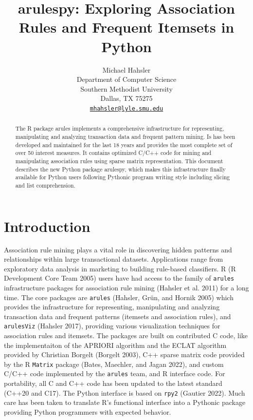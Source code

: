 \documentclass{article}
\title{arulespy: Exploring Association Rules and Frequent Itemsets in
Python}
\author{
    Michael Hahsler
   \\
    Department of Computer Science \\
    Southern Methodist University \\
  Dallas, TX 75275 \\
  \texttt{\href{mailto:mhahsler@lyle.smu.edu}{\nolinkurl{mhahsler@lyle.smu.edu}}} \\
  }
\begin{document}
\maketitle


\begin{abstract}
The R package arules implements a comprehensive infrastructure for
representing, manipulating and analyzing transaction data and frequent
pattern mining. Is has been developed and maintained for the last 18
years and provides the most complete set of over 50 interest measures.
It contains optimized C/C++ code for mining and manipulating association
rules using sparse matrix representation. This document describes the
new Python package arulespy, which makes this infrastructure finally
available for Python users following Pythonic program writing style
including slicing and list comprehension.
\end{abstract}


\hypertarget{introduction}{%
\section{Introduction}\label{introduction}}

Association rule mining plays a vital role in discovering hidden
patterns and relationships within large transactional datasets.
Applications range from exploratory data analysis in marketing to
building rule-based classifiers. R (R Development Core Team 2005) users
have had access to the family of \texttt{arules} infrastructure packages
for association rule mining (Hahsler et al. 2011) for a long time. The
core packages are \texttt{arules} (Hahsler, Grün, and Hornik 2005) which
provides the infrastructure for representing, manipulating and analyzing
transaction data and frequent patterns (itemsets and association rules),
and \texttt{arulesViz} (Hahsler 2017), providing various visualization
techniques for association rules and itemsets. The packages are built on
contributed C code, like the implementaiton of the APRIORI algorithm and
the ECLAT algorithm provided by Christian Borgelt (Borgelt 2003), C++
sparse matrix code provided by the R \texttt{Matrix} package (Bates,
Maechler, and Jagan 2022), and custom C/C++ code implemented by the
\texttt{arules} team, and R interface code. For portability, all C and
C++ code has been updated to the latest standard (C++20 and C17). The
Python interface is based on \texttt{rpy2} (Gautier 2022). Much care has
been taken to translate R's functional interface into a Pythonic package
providing Python programmers with expected behavior.
\end{document}
